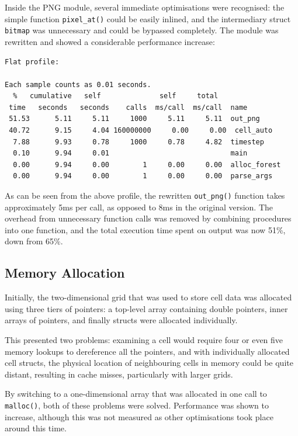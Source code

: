 \documentclass[11pt,a4paper]{report}
\begin{document}
Inside the PNG module, several immediate optimisations were recognised: the
simple function \texttt{pixel\_at()} could be easily inlined, and the
intermediary struct \texttt{bitmap} was unnecessary and could be bypassed
completely. The module was rewritten and showed a considerable
performance increase:


\begin{verbatim}
Flat profile:

Each sample counts as 0.01 seconds.
  %   cumulative   self              self     total
 time   seconds   seconds    calls  ms/call  ms/call  name
 51.53      5.11     5.11     1000     5.11     5.11  out_png
 40.72      9.15     4.04 160000000     0.00     0.00  cell_auto
  7.88      9.93     0.78     1000     0.78     4.82  timestep
  0.10      9.94     0.01                             main
  0.00      9.94     0.00        1     0.00     0.00  alloc_forest
  0.00      9.94     0.00        1     0.00     0.00  parse_args

\end{verbatim}

As can be seen from the above profile, the rewritten \texttt{out\_png()}
function takes approximately 5ms per call, as opposed to 8ms in the original
version. The overhead from unnecessary function calls was removed by combining
procedures into one function, and the total execution time spent on output was
now 51\%, down from 65\%.

\subsection{Memory Allocation}

Initially, the two-dimensional grid that was used to store cell data was
allocated using three tiers of pointers: a top-level array containing double
pointers, inner arrays of pointers, and finally structs were allocated
individually.

This presented two problems: examining a cell would require four or even five
memory lookups to dereference all the pointers, and with individually allocated
cell structs, the physical location of neighbouring cells in memory could be
quite distant, resulting in cache misses, particularly with larger grids.

By switching to a one-dimensional array that was allocated in one call to
\texttt{malloc()}, both of these problems were solved. Performance was shown to 
increase, although this was not measured as other optimisations took place
around this time.
\end{document}
